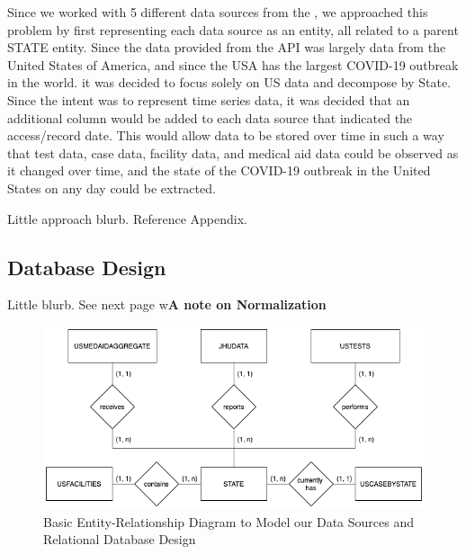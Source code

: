 \documentclass[11pt]{article}
\newcommand{\MYhref}[3][blue]{\href{#2}{\color{#1}{#3}}}%
\begin{document}
\noindent
Since we worked with 5 different data sources from the \MYhref{https://www.npmjs.com/package/covid19-api}{Covid-19 API}, we approached this problem by first representing each data source as an entity, all related to a parent STATE entity. Since the data provided from the API was largely data from the United States of America, and since the USA has the largest COVID-19 outbreak in the world. it was decided to focus solely on US data and decompose by State. Since the intent was to represent time series data, it was decided that an additional column would be added to each data source that indicated the access/record date. This would allow data to be stored over time in such a way that test data, case data, facility data, and medical aid data could be observed as it changed over time, and the state of the COVID-19 outbreak in the United States on any day could be extracted.


Little approach blurb. Reference Appendix.


\subsection{Database Design}
\label{subsec:design}

\noindent
Little blurb. See next page w\textbf{A note on Normalization}

\FloatBarrier
\begin{figure}[h]
    \centering
    \includegraphics[width=\textwidth]{diagrams/ER2.png}
    \caption{Basic Entity-Relationship Diagram to Model our Data Sources and Relational Database Design}
    \label{fig:er1}
\end{figure}
\FloatBarrier
\end{document}
